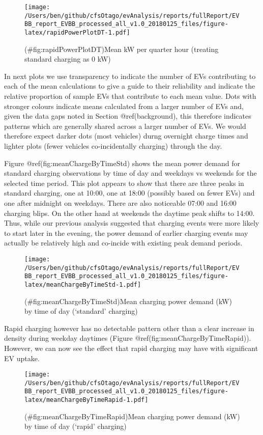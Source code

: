 \documentclass[]{article}
\begin{document}
\begin{figure}
\centering
\texttt{[image: /Users/ben/github/cfsOtago/evAnalysis/reports/fullReport/EVBB\_report\_EVBB\_processed\_all\_v1.0\_20180125\_files/figure-latex/rapidPowerPlotDT-1.pdf]}
\caption{(\#fig:rapidPowerPlotDT)Mean kW per quarter hour (treating standard charging as 0 kW)}
\end{figure}

In next plots we use transparency to indicate the number of EVs contributing to each of the mean calculations to give a guide to their reliability and indicate the relative proportion of sample EVs that contribute to each mean value. Dots with stronger colours indicate means calculated from a larger number of EVs and, given the data gaps noted in Section @ref(background), this therefore indicates patterns which are generally shared across a larger number of EVs. We would therefore expect darker dots (most vehicles) durng overnight charge times and lighter plots (fewer vehicles co-incidentally charging) through the day.

Figure @ref(fig:meanChargeByTimeStd) shows the mean power demand for standard charging observations by time of day and weekdays vs weekends for the selected time period. This plot appears to show that there are three peaks in standard charging, one at 10:00, one at 18:00 (possibly based on fewer EVs) and one after midnight on weekdays. There are also noticeable 07:00 and 16:00 charging blips. On the other hand at weekends the daytime peak shifts to 14:00. Thus, while our previous analysis suggested that charging events were more likely to start later in the evening, the power demand of earlier charging events may actually be relatively high and co-incide with existing peak demand periods.

\begin{figure}
\centering
\texttt{[image: /Users/ben/github/cfsOtago/evAnalysis/reports/fullReport/EVBB\_report\_EVBB\_processed\_all\_v1.0\_20180125\_files/figure-latex/meanChargeByTimeStd-1.pdf]}
\caption{(\#fig:meanChargeByTimeStd)Mean charging power demand (kW) by time of day (`standard' charging)}
\end{figure}

Rapid charging however has no detectable pattern other than a clear increase in density during weekday daytimes (Figure @ref(fig:meanChargeByTimeRapid)). However, we can now see the effect that rapid charging may have with significant EV uptake.

\begin{figure}
\centering
\texttt{[image: /Users/ben/github/cfsOtago/evAnalysis/reports/fullReport/EVBB\_report\_EVBB\_processed\_all\_v1.0\_20180125\_files/figure-latex/meanChargeByTimeRapid-1.pdf]}
\caption{(\#fig:meanChargeByTimeRapid)Mean charging power demand (kW) by time of day (`rapid' charging)}
\end{figure}
\end{document}
